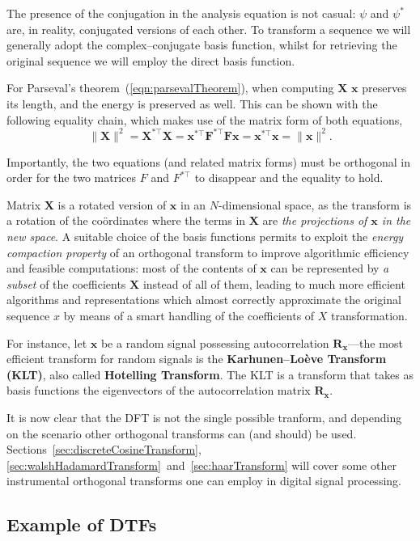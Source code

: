 \documentclass[\documentfontsize, twocolumn]{\classname}
\begin{document}
The presence of the conjugation in the analysis equation is not casual: $\psi$ and $\psi^*$ are, in reality, conjugated versions of each other. To transform a sequence we will generally adopt the complex--conjugate basis function, whilst for retrieving the original sequence we will employ the direct basis function.

For Parseval's theorem~(\ref{eqn:parsevalTheorem}), when computing $\bm X$ $\bm x$ preserves its length, and the energy is preserved as well. This can be shown with the following equality chain, which makes use of the matrix form of both equations,
\[
    \|\bm X\|^2 = \bm X^{*\top} \bm X = \bm x^{*\top}\bm F^{*\top} \bm {Fx} = \bm x^{*\top} \bm x = \|\bm x\|^2.
\]

Importantly, the two equations (and related matrix forms) must be orthogonal in order for the two matrices $F$ and $F^{*\top}$ to disappear and the equality to hold.

Matrix $\bm X$ is a rotated version of $\bm x$ in an $N$-dimensional space, as the transform is a rotation of the co\"ordinates where the terms in $\bm X$ are \emph{the projections of $\bm x$ in the new space}. A suitable choice of the basis functions permits to exploit the \emph{energy compaction property} of an orthogonal transform to improve algorithmic efficiency and feasible computations: most of the contents of $\bm x$ can be represented by \emph{a subset} of the coefficients $\bm X$ instead of all of them, leading to much more efficient algorithms and representations which almost correctly approximate the original sequence $x$ by means of a smart handling of the coefficients of $X$ transformation.

For instance, let $\bm x$ be a random signal possessing autocorrelation $\bm{R_x}$---the most efficient transform for random signals is the \textbf{Karhunen--Loève Transform (KLT)}, also called \textbf{Hotelling Transform}. The KLT is a transform that takes as basis functions the eigenvectors of the autocorrelation matrix $\bm {R_x}$.

It is now clear that the DFT is not the single possible tranform, and depending on the scenario other orthogonal transforms can (and should) be used. Sections~\ref{sec:discreteCosineTransform}, \ref{sec:walshHadamardTransform}~and~\ref{sec:haarTransform} will cover some other instrumental orthogonal transforms one can employ in digital signal processing.

\subsection{Example of DTFs}
\end{document}
